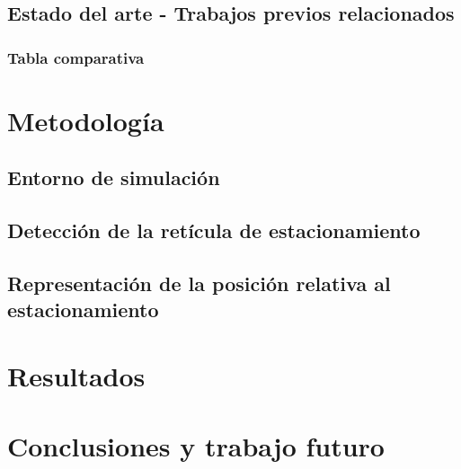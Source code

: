 \documentclass[10pt,letterpaper,final]{article}
\begin{document}
\subsection{Estado del arte - Trabajos previos relacionados}


\subsubsection{Tabla comparativa}



\clearpage
\section{Metodología}


\subsection{Entorno de simulación}


\subsection{Detección de la retícula de estacionamiento}


\subsection{Representación de la posición relativa al estacionamiento}




\clearpage
\section{Resultados}

\clearpage
\section{Conclusiones y trabajo futuro}

\clearpage


\end{document}
